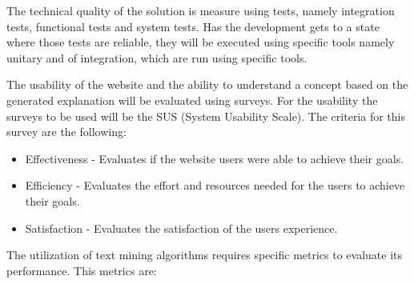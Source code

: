 The technical quality of the solution is measure using tests, namely integration tests, functional tests and system tests.
Has the development gets to a state where those tests are reliable, they will be executed using specific tools  namely unitary and of integration, which are run using specific tools.

The usability of the website and the ability to understand a concept based on the generated explanation will be evaluated using surveys.
For the usability the surveys to be used will be the SUS (System Usability Scale).
The criteria for this survey are the following:

\begin{itemize}
    \item Effectiveness - Evaluates if the website users were able to achieve their goals.
    \item Efficiency - Evaluates the effort and resources needed for the users to achieve their goals.
    \item Satisfaction - Evaluates the satisfaction of the users experience.
\end{itemize}

The utilization of text mining algorithms requires specific metrics to evaluate its performance.
This metrics are:

